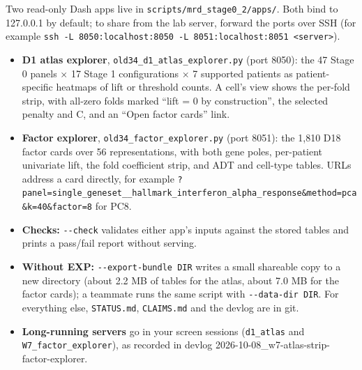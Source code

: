 Two read-only Dash apps live in \nolinkurl{scripts/mrd_stage0_2/apps/}. Both bind to 127.0.0.1 by default; to share from the lab server, forward the ports over SSH (for example \texttt{ssh -L 8050:localhost:8050 -L 8051:localhost:8051 <server>}).
\begin{itemize}
\item \textbf{D1 atlas explorer}, \texttt{old34\_d1\_atlas\_explorer.py} (port 8050): the 47 Stage 0 panels $\times$ 17 Stage 1 configurations $\times$ 7 supported patients as patient-specific heatmaps of lift or threshold counts. A cell's view shows the per-fold strip, with all-zero folds marked ``lift = 0 by construction'', the selected penalty and C, and an ``Open factor cards'' link.
\item \textbf{Factor explorer}, \texttt{old34\_factor\_explorer.py} (port 8051): the 1,810 D18 factor cards over 56 representations, with both gene poles, per-patient univariate lift, the fold coefficient strip, and ADT and cell-type tables. URLs address a card directly, for example \nolinkurl{?panel=single_geneset__hallmark_interferon_alpha_response&method=pca&k=40&factor=8} for PC8.
\item \textbf{Checks:} \texttt{-{}-check} validates either app's inputs against the stored tables and prints a pass/fail report without serving.
\item \textbf{Without EXP:} \texttt{-{}-export-bundle DIR} writes a small shareable copy to a new directory (about 2.2 MB of tables for the atlas, about 7.0 MB for the factor cards); a teammate runs the same script with \texttt{-{}-data-dir DIR}. For everything else, \texttt{STATUS.md}, \texttt{CLAIMS.md} and the devlog are in git.
\item \textbf{Long-running servers} go in your screen sessions (\texttt{d1\_atlas} and \texttt{W7\_factor\_explorer}), as recorded in devlog 2026-10-08\_w7-atlas-strip-factor-explorer.
\end{itemize}
